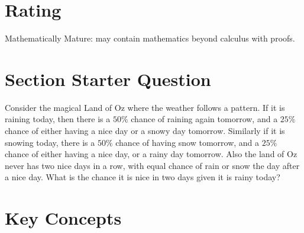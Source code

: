 \documentclass[12pt]{article}
\begin{document}
\myheader \mytitle

\hr


\hr

\usefirefox


\hr

\section*{Rating} %
Mathematically Mature:  may contain mathematics beyond calculus with
proofs.  %

\hr

\section*{Section Starter Question}

Consider the magical Land of Oz where the weather follows a pattern.  If
it is raining today, then there is a \( 50\% \) chance of raining again
tomorrow, and a \( 25\% \) chance of either having a nice day or a snowy
day tomorrow.  Similarly if it is snowing today, there is a \( 50\% \)
chance of having snow tomorrow, and a \( 25\% \) chance of either having
a nice day, or a rainy day tomorrow.  Also the land of Oz never has two
nice days in a row, with equal chance of rain or snow the day after a
nice day.  What is the chance it is nice in two days given it is rainy
today?

\hr

\section*{Key Concepts}
\end{document}
